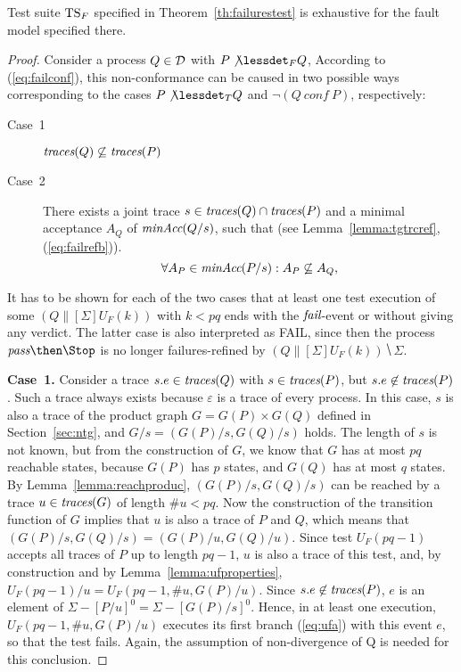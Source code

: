 %
\begin{lemma}\label{lemma:mainfexhaustive}
Test suite ${\text{TS}}_F$ specified in Theorem~\ref{th:failurestest} is exhaustive
for the fault model specified there.
\end{lemma}
\begin{proof}
Consider a process $Q\in{\cal D}$ with $P\not\lessdet_F Q$, According to
(\ref{eq:failconf}), this non-conformance can be caused in two possible ways
corresponding to the cases $P\not\lessdet_T Q$ and $\neg(Q\ conf\ P)$,
respectively:
\begin{description}
\item[Case~1] $\text{\it traces}(Q)\not\subseteq \text{\it traces}(P)$
\item[Case~2] There exists a joint trace $s\in\text{\it traces}(Q)\cap\text{\it traces}(P)$ and a minimal acceptance $A_Q$
of $\text{\it minAcc}(Q/s)$, such that
(see Lemma~\ref{lemma:tgtrcref}, (\ref{eq:failrefb})).
\begin{equation}
\label{eq:accsnotcontained}
\forall A_P\in\text{\it minAcc}(P/s): A_P\not\subseteq A_Q,
\end{equation}
\end{description}
It has to be shown for each of the two cases that at least one test
execution of some $(Q\parallel[\Sigma] U_F(k))$ with $k < pq$ ends with the
   ${\text{\it fail}}$-event or without giving any verdict. The latter case is also
interpreted  as FAIL, since then the process $\epass\then\Stop$ is no longer
failures-refined by $(Q\parallel[\Sigma] U_F(k))\hide \Sigma$.

\medskip
\noindent
{\bf Case~1.} Consider a  trace $s.e\in\text{\it traces}(Q)$ with $s\in\text{\it traces}(P)$, but
$s.e\not\in\text{\it traces}(P)$. Such a trace always exists because $\varepsilon$ is a
trace of every process. In this case, $s$ is also a trace of the product
graph $G = G(P)\times G(Q)$ defined in Section~\ref{sec:ntg}, and  
$G/s = (G(P)/s,G(Q)/s)$ holds. The length of $s$ is not known, but from the construction
of $G$,  we know that $G$ has at most $pq$ reachable states, because $G(P)$
has $p$ states, and $G(Q)$ has at most $q$ states. By
Lemma~\ref{lemma:reachproduc}, $(G(P)/s,G(Q)/s)$ can be reached by a trace
$u\in\text{\it traces}(G)$ of length $\#u < pq$. Now the construction of the transition
function of $G$ implies that $u$ is also a trace of $P$ and $Q$, 
which means that 
$(G(P)/s,G(Q)/s) = (G(P)/u,G(Q)/u)$. Since test
$U_F(pq-1)$ accepts all traces of $P$ up to length $pq-1$, $u$ is also a
trace of this test, and, by construction and by Lemma~\ref{lemma:ufproperties}, 
$U_F(pq-1)/u = U_F(pq-1,\#u,G(P)/u)$. Since
$s.e\not\in\text{\it traces}(P)$, $e$ is an element of $\Sigma-[P/u]^0 = \Sigma - [G(P)/s]^0$. 
Hence, in at least
one execution, $U_F(pq-1,\#u,G(P)/u)$ executes its first branch (\ref{eq:ufa}) with
this event $e$, so that the test fails. Again, the
assumption of non-divergence of Q is needed for this conclusion.  


\end{proof}
